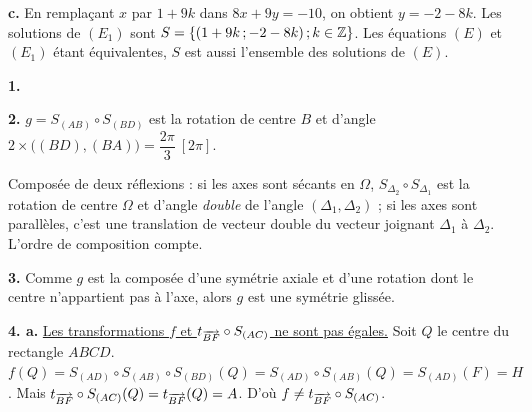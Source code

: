 \documentclass[11pt]{article}
\begin{document}
\textbf{c.} En remplaçant $x$ par $1 + 9k$ dans $8x + 9y = -10$, on obtient $y = -2 - 8k$. Les solutions de $(E_1)$ sont $S = \{(1 + 9k\,;-2 - 8k)\,;k \in \mathbb{Z}\}$. Les équations $(E)$ et $(E_1)$ étant équivalentes, $S$ est aussi l'ensemble des solutions de $(E)$.


\textbf{1.} \begin{center}
\end{center}

\textbf{2.} $g = S_{(AB)} \circ S_{(BD)}$ est la rotation de centre $B$ et d'angle $2 \times \big((BD),(BA)\big) = \dfrac{2\pi}{3}\ [2\pi]$.

\begin{rappel}
Composée de deux réflexions : si les axes sont sécants en $\Omega$,
$S_{\Delta_2} \circ S_{\Delta_1}$ est la rotation de centre $\Omega$ et
d'angle \emph{double} de l'angle $(\Delta_1, \Delta_2)$ ; si les axes
sont parallèles, c'est une translation de vecteur double du vecteur
joignant $\Delta_1$ à $\Delta_2$. L'ordre de composition compte.
\end{rappel}

\textbf{3.} Comme $g$ est la composée d'une symétrie axiale et d'une rotation dont le centre n'appartient pas à l'axe, alors $g$ est une symétrie glissée.

\textbf{4. a.} \underline{Les transformations $f$ et $t_{\overrightarrow{BF}} \circ S_{(AC)}$ ne sont pas égales.} Soit $Q$ le centre du rectangle $ABCD$. $f(Q) = S_{(AD)} \circ S_{(AB)} \circ S_{(BD)}(Q) = S_{(AD)} \circ S_{(AB)}(Q) = S_{(AD)}(F) = H$. Mais $t_{\overrightarrow{BF}} \circ S_{(AC)}(Q) = t_{\overrightarrow{BF}}(Q) = A$. D'où $f \ne t_{\overrightarrow{BF}} \circ S_{(AC)}$.
\end{document}

